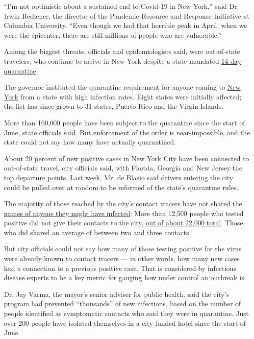 ``I'm not optimistic about a sustained end to Covid-19 in New York,''
said Dr. Irwin Redlener, the director of the Pandemic Resource and
Response Initiative at Columbia University. ``Even though we had that
horrible peak in April, when we were the epicenter, there are still
millions of people who are vulnerable.''

Among the biggest threats, officials and epidemiologists said, were
out-of-state travelers, who continue to arrive in New York despite a
state-mandated
\href{https://www.nytimes3xbfgragh.onion/2020/06/24/nyregion/ny-coronavirus-states-quarantine.html}{14-day
quarantine}.

The governor instituted the quarantine requirement for anyone coming to
\href{https://www.nytimes3xbfgragh.onion/2020/07/14/nyregion/ny-quarantine-rules.html}{New
York} from a state with high infection rates. Eight states were
initially affected; the list has since grown to 31 states, Puerto Rico
and the Virgin Islands.

More than 160,000 people have been subject to the quarantine since the
start of June, state officials said. But enforcement of the order is
near-impossible, and the state could not say how many have actually
quarantined.

About 20 percent of new positive cases in New York City have been
connected to out-of-state travel, city officials said, with Florida,
Georgia and New Jersey the top departure points. Last week, Mr. de
Blasio said drivers entering the city could be pulled over at random to
be informed of the state's quarantine rules.

The majority of those reached by the city's contact tracers have
\href{https://www.nytimes3xbfgragh.onion/2020/07/29/nyregion/new-york-contact-tracing.html}{not
shared the names of anyone they might have infected}: More than 12,500
people who tested positive did not give their contacts to the city,
\href{https://hhinternet.blob.core.windows.net/uploads/2020/08/test-and-trace-data-metrics-20200803.pdf}{out
of about 22,000 total}. Those who did shared an average of between two
and three contacts.

But city officials could not say how many of those testing positive for
the virus were already known to contact tracers --- in other words, how
many new cases had a connection to a previous positive case. That is
considered by infectious disease experts to be a key metric for gauging
how under control an outbreak is.

Dr. Jay Varma, the mayor's senior adviser for public health, said the
city's program had prevented ``thousands'' of new infections, based on
the number of people identified as symptomatic contacts who said they
were in quarantine. Just over 200 people have isolated themselves in a
city-funded hotel since the start of June.

